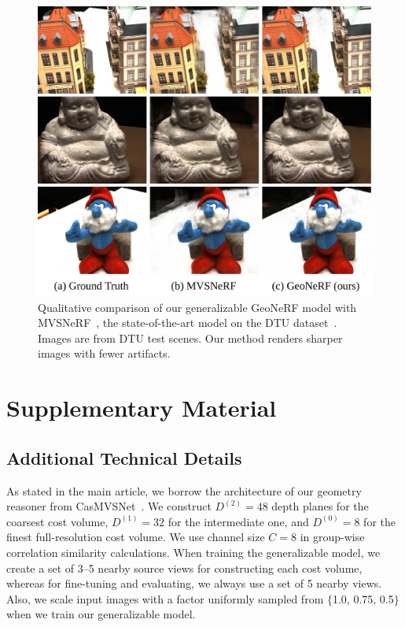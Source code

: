 \begin{figure}[!t]
    \begin{center}
        \includegraphics[width=0.9\linewidth]{images/chapter3/figures/Fig3.jpg}
    \end{center}
   \caption{Qualitative comparison of our generalizable GeoNeRF model with MVSNeRF~\cite{chen2021mvsnerf}, the state-of-the-art model on the DTU dataset~\cite{jensen2014large}. Images are from DTU test scenes. Our method renders sharper images with fewer artifacts.}
    \label{fig:c3_qualitative_dtu}
\end{figure}
\FloatBarrier

\section{Supplementary Material}

\subsection{Additional Technical Details}

As stated in the main article, we borrow the architecture of our geometry reasoner from CasMVSNet~\cite{gu2020cascade}. We construct $D^{(2)} = 48$ depth planes for the coarsest cost volume, $D^{(1)} = 32$ for the intermediate one, and $D^{(0)} = 8$ for the finest full-resolution cost volume. We use channel size $C = 8$ in group-wise correlation similarity calculations. When training the generalizable model, we create a set of 3$\textrm{--}$5 nearby source views for constructing each cost volume, whereas for fine-tuning and evaluating, we always use a set of 5 nearby views. Also, we scale input images with a factor uniformly sampled from $\{$1.0, 0.75, 0.5$\}$ when we train our generalizable model.

